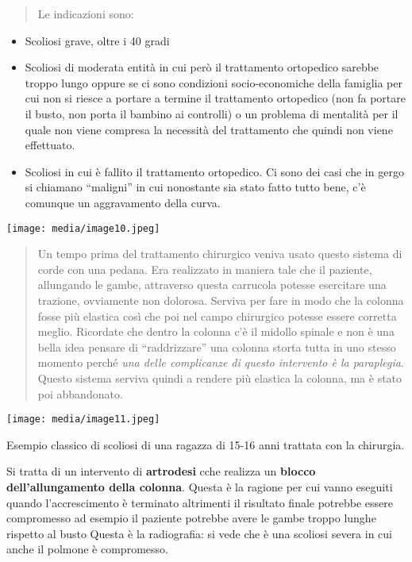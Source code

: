 \documentclass[]{article}
\begin{document}
\begin{quote}
Le indicazioni sono:
\end{quote}

\begin{itemize}
\item
  Scoliosi grave, oltre i 40 gradi
\item
  Scoliosi di moderata entità in cui però il trattamento ortopedico
  sarebbe troppo lungo oppure se ci sono condizioni socio-economiche
  della famiglia per cui non si riesce a portare a termine il
  trattamento ortopedico (non fa portare il busto, non porta il bambino
  ai controlli) o un problema di mentalità per il quale non viene
  compresa la necessità del trattamento che quindi non viene effettuato.
\item
  Scoliosi in cui è fallito il trattamento ortopedico. Ci sono dei casi
  che in gergo si chiamano ``maligni'' in cui nonostante sia stato fatto
  tutto bene, c'è comunque un aggravamento della curva.
\end{itemize}

\texttt{[image: media/image10.jpeg]}

\begin{quote}
Un tempo prima del trattamento chirurgico veniva usato questo sistema di
corde con una pedana. Era realizzato in maniera tale che il paziente,
allungando le gambe, attraverso questa carrucola potesse esercitare una
trazione, ovviamente non dolorosa. Serviva per fare in modo che la
colonna fosse più elastica così che poi nel campo chirurgico potesse
essere corretta meglio. Ricordate che dentro la colonna c'è il midollo
spinale e non è una bella idea pensare di ``raddrizzare'' una colonna
storta tutta in uno stesso momento perché \emph{una delle complicanze di
questo intervento è la paraplegia}. Questo sistema serviva quindi a
rendere più elastica la colonna, ma è stato poi abbandonato.
\end{quote}

\texttt{[image: media/image11.jpeg]}

Esempio classico di scoliosi di una ragazza di 15-16 anni trattata con
la chirurgia.

Si tratta di un intervento di \textbf{artrodesi} cche realizza un
\textbf{blocco dell'allungamento della colonna}. Questa è la ragione per
cui vanno eseguiti quando l'accrescimento è terminato altrimenti il
risultato finale potrebbe essere compromesso ad esempio il paziente
potrebbe avere le gambe troppo lunghe rispetto al busto Questa è la
radiografia: si vede che è una scoliosi severa in cui anche il polmone è
compromesso.
\end{document}
